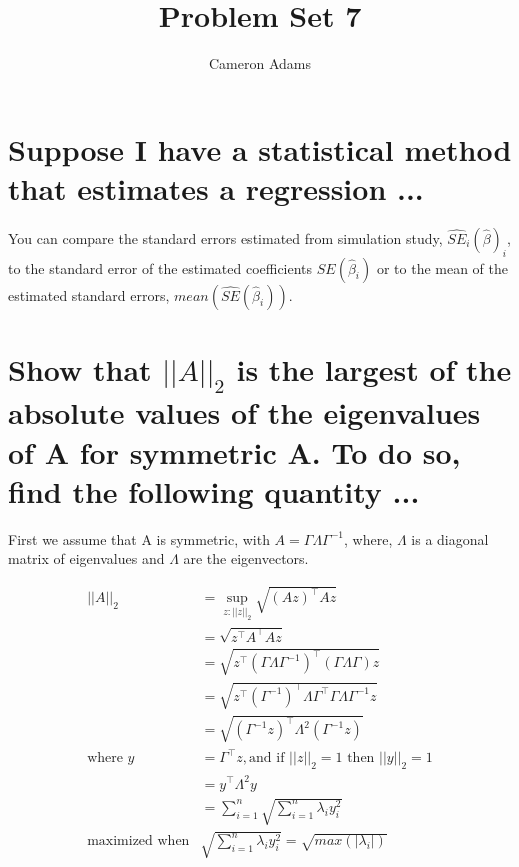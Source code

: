 \documentclass{article}\usepackage[]{graphicx}\usepackage[]{color}
\title{Problem Set 7}
\author{Cameron Adams}
\begin{document}

\maketitle





\section{Suppose I have a statistical method that estimates a regression ...}



You can compare the standard errors estimated from simulation study, $\hat{SE}_i(\hat{\beta})_i$, to the standard error of the estimated coefficients $SE(\hat{\beta}_i)$ or to the mean of the estimated standard errors, $mean(\hat{SE}(\hat{\beta}_i))$.


\section{Show that $||A||_2$ is the largest of the absolute values of the eigenvalues of A for symmetric A. To do so, find the following quantity ...}

First we assume that A is symmetric, with $A = \Gamma \Lambda \Gamma^{-1}$, where, $\Lambda$ is a diagonal matrix of eigenvalues and $\Lambda$ are the eigenvectors.

$$\begin{aligned}
||A||_2 &= \sup_{z:||z||_2} \sqrt{(Az)^\top Az} \\
&= \sqrt{z^\top A^\top Az} \\
&= \sqrt{z^\top (\Gamma \Lambda \Gamma^{-1})^\top (\Gamma \Lambda \Gamma)z} \\
&= \sqrt{z^\top (\Gamma^{-1})^\top \Lambda \Gamma^\top \Gamma \Lambda \Gamma^{-1}z} \\
&= \sqrt{(\Gamma^{-1} z)^\top \Lambda^2 (\Gamma^{-1} z)} \\
\text{where } y &= \Gamma^\top z, \text{and if } ||z||_2 = 1 \text{ then } ||y||_2 = 1 \\
&= y^\top \Lambda^2 y \\
&= \sum_{i=1}^n \sqrt{ \sum_{i=1}^n \lambda_i y_i^2} \\
\text{maximized when} &\sqrt{ \sum_{i=1}^n \lambda_i y_i^2} = \sqrt{max(|\lambda_i|)} \\
\end{aligned}$$
\end{document}
